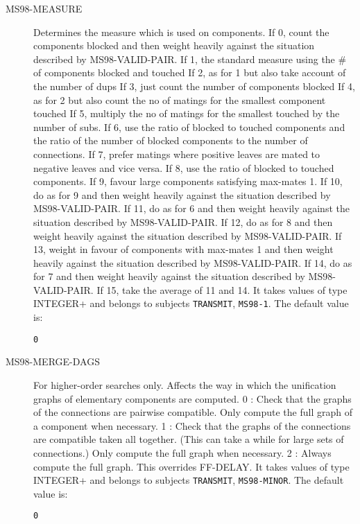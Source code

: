 \begin{description}
\item[MS98-MEASURE]  
Determines the measure which is used on components.
If 0, count the components blocked and then weight heavily against 
      the situation described by MS98-VALID-PAIR.
If 1, the standard measure using the \#  of components blocked and touched
If 2, as for 1 but also take account of the number of dups
If 3, just count the number of components blocked
If 4, as for 2 but also count the no of matings for the smallest 
      component touched
If 5, multiply the no of matings for the smallest touched by the 
      number of subs.
If 6, use the ratio of blocked to touched components and the ratio
      of the number of blocked components to the number of connections.
If 7, prefer matings where positive leaves are mated to negative leaves
      and vice versa.
If 8, use the ratio of blocked to touched components.
If 9, favour large components satisfying max-mates 1.
If 10, do as for 9 and then weight heavily against 
      the situation described by MS98-VALID-PAIR.
If 11, do as for 6 and then weight heavily against 
      the situation described by MS98-VALID-PAIR.
If 12, do as for 8 and then weight heavily against 
      the situation described by MS98-VALID-PAIR.
If 13, weight in favour of components with max-mates 1 and then 
      weight heavily against the situation described by MS98-VALID-PAIR.
If 14, do as for 7 and then weight heavily against 
      the situation described by MS98-VALID-PAIR.
If 15, take the average of 11 and 14.
It takes values of type INTEGER+ and belongs to subjects \texttt{TRANSMIT}, \texttt{MS98-1}.  The default value is: \begin{lstlisting}
0
\end{lstlisting}

\item[MS98-MERGE-DAGS]  
For higher-order searches only. Affects the way in 
which the unification graphs of elementary components are 
computed.
0 : Check that the graphs of the connections are pairwise
    compatible. Only compute the full graph of a component
    when necessary.
1 : Check that the graphs of the connections are compatible
    taken all together. (This can take a while for large
    sets of connections.) Only compute the full graph when 
    necessary.
2 : Always compute the full graph. This overrides FF-DELAY.
It takes values of type INTEGER+ and belongs to subjects \texttt{TRANSMIT}, \texttt{MS98-MINOR}.  The default value is: \begin{lstlisting}
0
\end{lstlisting}


\end{description}
